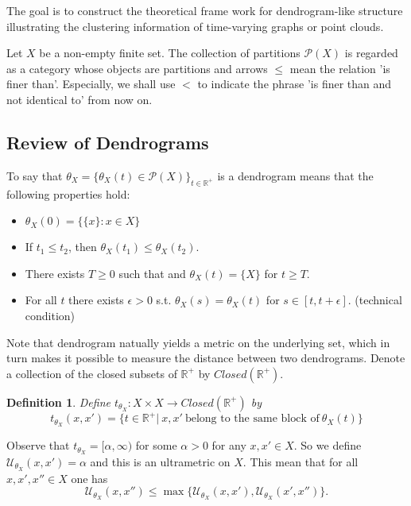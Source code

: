 \documentclass[a4paper,12pt]{article}
\newtheorem{definition}{Definition}[section]
\begin{document}
The goal is to construct the theoretical frame work for dendrogram-like structure illustrating the clustering information of time-varying graphs or point clouds.

Let $X$ be a non-empty finite set. The collection of partitions $\mathcal{P}(X)$ is regarded as a category whose objects are partitions and arrows $\leq$ mean the relation 'is finer than'. Especially, we shall use $<$ to indicate the phrase 'is finer than and not identical to' from now on.

\subsection{Review of Dendrograms}
 To say that $\theta_X=\{\theta_X(t)\in \mathcal{P}(X)\}_{t\in\mathbb{R}^+}
$ is a dendrogram means that the following properties hold:

\begin{itemize}
\item $\theta_X(0)=\{\{x\}: x\in X\}$
\item If $t_1\leq t_2$, then $\theta_X(t_1) \leq \theta_X(t_2)$.
\item There exists $T\geq0$ such that and $\theta_X(t)=\{X\}$ for $t\geq T$.
\item For all $t$ there exists $\epsilon>0$ s.t. $\theta_X(s)=\theta_X(t)$ for $s\in [t,t+\epsilon]$. (technical condition)

\end{itemize}

Note that dendrogram natually yields a metric on the underlying set, which in turn makes it possible to measure the distance between two dendrograms. Denote a collection of the closed subsets of $\mathbb{R^+}$ by $Closed(\mathbb{R^+})$.
\begin{definition} Define $t_{\theta_X}:X\times X \rightarrow Closed(\mathbb{R}^+)$ by 
$$t_{\theta_X}(x,x')=\{t\in \mathbb{R}^+|\ x, x'\ \mbox{belong to the same block of}\ \theta_{X}(t)\}$$
\end{definition}

Observe that $t_{\theta_X}=[\alpha, \infty)$ for some $\alpha >0$ for any $x,x'\in X$. So we define $\mathcal{U}_{\theta_X}(x,x')=\alpha$ and this is an ultrametric on $X$. This mean that for all $x,x',x''\in X$ one has $$\mathcal{U}_{\theta_X}(x,x'')\leq \max\big\{\mathcal{U}_{\theta_X}(x,x'),\mathcal{U}_{\theta_X}(x',x'')\big\}.$$
\end{document}
